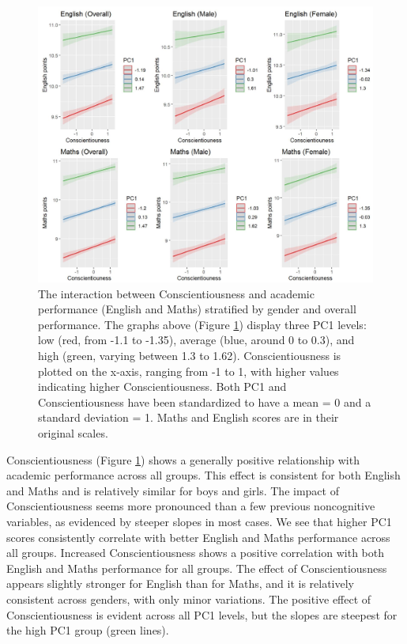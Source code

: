 \documentclass[12pt,a4paper,onecolumn]{article}
\numberwithin{equation}{section}
\begin{document}
\begin{figure}[ht] 
    \centering
    \includegraphics[width=1\linewidth]{AVE_TIPI_Cons.JPG}
    \caption{The interaction between Conscientiousness and academic performance (English and Maths) stratified by gender and overall performance. The graphs above (Figure \ref{Fig6}) display three PC1 levels: low (red, from -1.1 to -1.35), average (blue, around 0 to 0.3), and high (green, varying between 1.3 to 1.62). Conscientiousness is plotted on the x-axis, ranging from -1 to 1, with higher values indicating higher Conscientiousness. Both PC1 and Conscientiousness have been standardized to have a mean = 0 and a standard deviation = 1. Maths and English scores are in their original scales.}
    \label{Fig6}
\end{figure}

Conscientiousness (Figure \ref{Fig6}) shows a generally positive relationship with academic performance across all groups. This effect is consistent for both English and Maths and is relatively similar for boys and girls. The impact of Conscientiousness seems more pronounced than a few previous noncognitive variables, as evidenced by steeper slopes in most cases. We see that higher PC1 scores consistently correlate with better English and Maths performance across all groups.
Increased Conscientiousness shows a positive correlation with both English and Maths performance for all groups. The effect of Conscientiousness appears slightly stronger for English than for Maths, and it is relatively consistent across genders, with only minor variations. The positive effect of Conscientiousness is evident across all PC1 levels, but the slopes are steepest for the high PC1 group (green lines).
\end{document}

